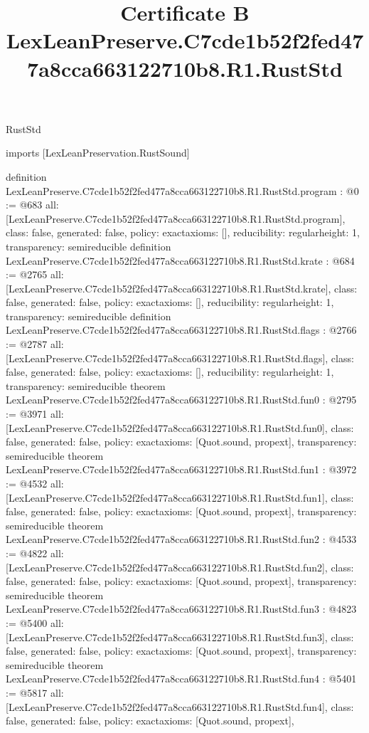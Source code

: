 \begin{lexlean}{RustStd}
\title{Certificate B LexLeanPreserve.C7cde1b52f2fed477a8cca663122710b8.R1.RustStd}
\begin{coremodule}
imports [LexLeanPreservation.RustSound]

definition LexLeanPreserve.C7cde1b52f2fed477a8cca663122710b8.R1.RustStd.program : @0 := @683 {
  all: [LexLeanPreserve.C7cde1b52f2fed477a8cca663122710b8.R1.RustStd.program],
  class: false,
  generated: false,
  policy: exact{axioms: []},
  reducibility: regular{height: 1},
  transparency: semireducible
}
definition LexLeanPreserve.C7cde1b52f2fed477a8cca663122710b8.R1.RustStd.krate : @684 := @2765 {
  all: [LexLeanPreserve.C7cde1b52f2fed477a8cca663122710b8.R1.RustStd.krate],
  class: false,
  generated: false,
  policy: exact{axioms: []},
  reducibility: regular{height: 1},
  transparency: semireducible
}
definition LexLeanPreserve.C7cde1b52f2fed477a8cca663122710b8.R1.RustStd.flags : @2766 := @2787 {
  all: [LexLeanPreserve.C7cde1b52f2fed477a8cca663122710b8.R1.RustStd.flags],
  class: false,
  generated: false,
  policy: exact{axioms: []},
  reducibility: regular{height: 1},
  transparency: semireducible
}
theorem LexLeanPreserve.C7cde1b52f2fed477a8cca663122710b8.R1.RustStd.fun0 : @2795 := @3971 {
  all: [LexLeanPreserve.C7cde1b52f2fed477a8cca663122710b8.R1.RustStd.fun0],
  class: false,
  generated: false,
  policy: exact{axioms: [Quot.sound, propext]},
  transparency: semireducible
}
theorem LexLeanPreserve.C7cde1b52f2fed477a8cca663122710b8.R1.RustStd.fun1 : @3972 := @4532 {
  all: [LexLeanPreserve.C7cde1b52f2fed477a8cca663122710b8.R1.RustStd.fun1],
  class: false,
  generated: false,
  policy: exact{axioms: [Quot.sound, propext]},
  transparency: semireducible
}
theorem LexLeanPreserve.C7cde1b52f2fed477a8cca663122710b8.R1.RustStd.fun2 : @4533 := @4822 {
  all: [LexLeanPreserve.C7cde1b52f2fed477a8cca663122710b8.R1.RustStd.fun2],
  class: false,
  generated: false,
  policy: exact{axioms: [Quot.sound, propext]},
  transparency: semireducible
}
theorem LexLeanPreserve.C7cde1b52f2fed477a8cca663122710b8.R1.RustStd.fun3 : @4823 := @5400 {
  all: [LexLeanPreserve.C7cde1b52f2fed477a8cca663122710b8.R1.RustStd.fun3],
  class: false,
  generated: false,
  policy: exact{axioms: [Quot.sound, propext]},
  transparency: semireducible
}
theorem LexLeanPreserve.C7cde1b52f2fed477a8cca663122710b8.R1.RustStd.fun4 : @5401 := @5817 {
  all: [LexLeanPreserve.C7cde1b52f2fed477a8cca663122710b8.R1.RustStd.fun4],
  class: false,
  generated: false,
  policy: exact{axioms: [Quot.sound, propext]},
}
\end{coremodule}
\end{lexlean}

